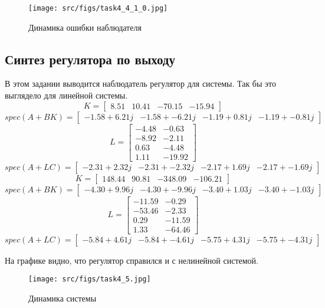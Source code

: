 \begin{figure}[ht!]
    \centering
    \texttt{[image: src/figs/task4\_4\_1\_0.jpg]}
    \caption{Динамика ошибки наблюдателя}
    \label{fig:task4_4_3}
\end{figure}
\FloatBarrier

\subsection{Синтез регулятора по выходу}
В этом задании выводится наблюдатель регулятор для системы. Так бы это выглядело для линейной системы.
\[K = \begin{bmatrix}
    8.51 &  10.41 & -70.15 & -15.94
  \end{bmatrix}\]
  \[spec(A + B K) = \begin{bmatrix}
   -1.58 + 6.21j & -1.58 + -6.21j & -1.19 + 0.81j & -1.19 + -0.81j
  \end{bmatrix}\]
  \[L = \begin{bmatrix}
   -4.48 & -0.63\\
   -8.92 & -2.11\\
    0.63 & -4.48\\
    1.11 & -19.92
  \end{bmatrix}\]
  \[spec(A + L C) = \begin{bmatrix}
   -2.31 + 2.32j & -2.31 + -2.32j & -2.17 + 1.69j & -2.17 + -1.69j
  \end{bmatrix}\]
  \[K = \begin{bmatrix}
    148.44 &  90.81 & -348.09 & -106.21
  \end{bmatrix}\]
  \[spec(A + B K) = \begin{bmatrix}
   -4.30 + 9.96j & -4.30 + -9.96j & -3.40 + 1.03j & -3.40 + -1.03j
  \end{bmatrix}\]
  \[L = \begin{bmatrix}
   -11.59 & -0.29\\
   -53.46 & -2.33\\
    0.29 & -11.59\\
    1.33 & -64.46
  \end{bmatrix}\]
  \[spec(A + L C) = \begin{bmatrix}
   -5.84 + 4.61j & -5.84 + -4.61j & -5.75 + 4.31j & -5.75 + -4.31j
  \end{bmatrix}\]
  

На графике видно, что регулятор справился и с нелинейной системой.
\begin{figure}[ht!]
    \centering
    \texttt{[image: src/figs/task4\_5.jpg]}
    \caption{Динамика системы}
    \label{fig:task4_5_new}
\end{figure}
\FloatBarrier

\FloatBarrier